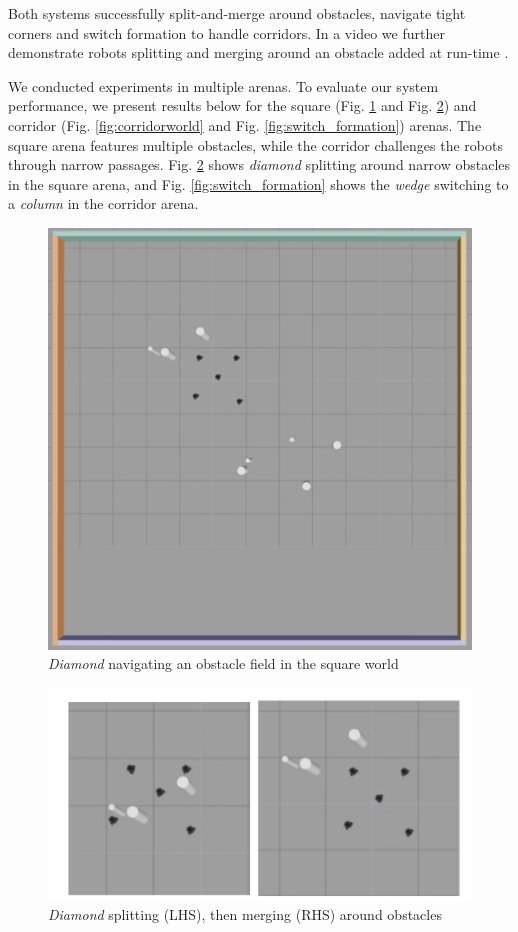 \documentclass[letterpaper, 10 pt, conference]{ieeeconf}  %
\begin{document}
Both systems successfully split-and-merge around obstacles, navigate tight corners and switch formation to handle corridors. In a video we further demonstrate robots splitting and merging around an obstacle added at run-time \cite{repository}. 

We conducted experiments in multiple arenas. To evaluate our system performance, we present results below for the square (Fig. \ref{fig:square} and Fig. \ref{fig:split_merge}) and corridor (Fig. \ref{fig:corridorworld} and Fig. \ref{fig:switch_formation}) arenas. The square arena features multiple obstacles, while the corridor challenges the robots through narrow passages. Fig. \ref{fig:split_merge} shows \textit{diamond} splitting around narrow obstacles in the square arena, and Fig. \ref{fig:switch_formation} shows the \textit{wedge} switching to a \textit{column} in the corridor arena.

\begin{figure}[tb]	
\centering	
\includegraphics[width=0.7\linewidth]{images/square.png}	
\caption{\textit{Diamond} navigating an obstacle field in the square world}	
\label{fig:square}	
\end{figure}

\begin{figure}[tb]
\centering	
\includegraphics[width=0.8\linewidth]{images/split_merge.png}	
\caption{\textit{Diamond} splitting (LHS), then merging (RHS) around obstacles}	
\label{fig:split_merge}	
\end{figure}
\end{document}
